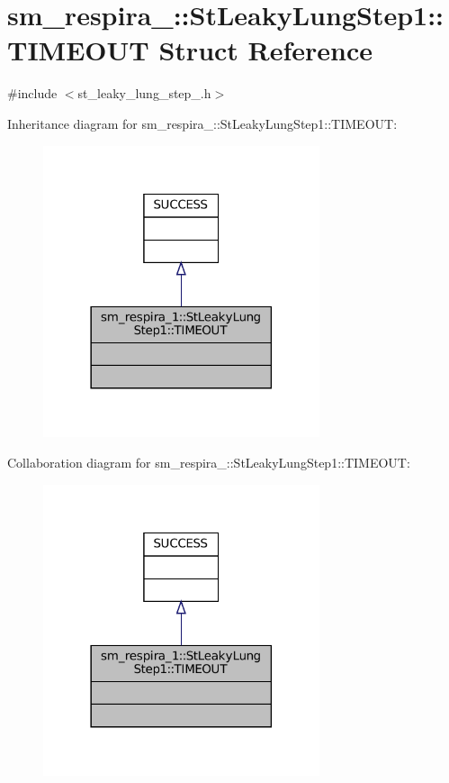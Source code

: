 \hypertarget{structsm__respira__1_1_1StLeakyLungStep1_1_1TIMEOUT}{}\section{sm\+\_\+respira\+\_\+:\+:St\+Leaky\+Lung\+Step1\+:\+:T\+I\+M\+E\+O\+UT Struct Reference}
\label{structsm__respira__1_1_1StLeakyLungStep1_1_1TIMEOUT}


{\ttfamily \#include $<$st\+\_\+leaky\+\_\+lung\+\_\+step\+\_.\+h$>$}



Inheritance diagram for sm\+\_\+respira\+\_\+:\+:St\+Leaky\+Lung\+Step1\+:\+:T\+I\+M\+E\+O\+UT\+:
\nopagebreak
\begin{figure}[H]
\begin{center}
\leavevmode
\includegraphics[width=230pt]{structsm__respira__1_1_1StLeakyLungStep1_1_1TIMEOUT__inherit__graph}
\end{center}
\end{figure}


Collaboration diagram for sm\+\_\+respira\+\_\+:\+:St\+Leaky\+Lung\+Step1\+:\+:T\+I\+M\+E\+O\+UT\+:
\nopagebreak
\begin{figure}[H]
\begin{center}
\leavevmode
\includegraphics[width=230pt]{structsm__respira__1_1_1StLeakyLungStep1_1_1TIMEOUT__coll__graph}
\end{center}
\end{figure}


